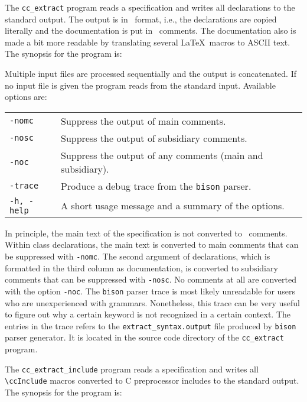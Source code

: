 \documentclass[12pt]{article}
\makeatletter
\newcommand{\TTindex}[1]{\index{#1@{\tt #1}}}
\def\ind{\hspace*{7mm}}
\makeatother
\begin{document}
The {\tt cc\_extract} program reads a specification and writes all
declarations to the standard output. The output is in \CC\ format,
i.e., the declarations are copied literally and the documentation is
put in \CC\ comments. The documentation also is made a bit more
readable by translating several \LaTeX\ macros to ASCII text. The
synopsis for the program is:

\ind{\tt cc\_extract [<options>] [<infile> ...]}

Multiple input files are processed sequentially and the output is
concatenated. If no input file is given the program reads from the
standard input. Available options are:

\begin{tabular}{ll}
    {\tt -nomc}  & Suppress the output of main comments. \\
    {\tt -nosc}  & Suppress the output of subsidiary comments. \\
    {\tt -noc}   & Suppress the output of any comments (main and subsidiary).\\
    {\tt -trace} & Produce a debug trace from the {\tt bison} parser. \\
    {\tt -h, -help} & A short usage message and a summary of the options.
\end{tabular}

In principle, the main text of the specification is not converted to
\CC\ comments. Within class declarations, the main text is converted
to main comments that can be suppressed with {\tt -nomc}. The second
argument of declarations, which is formatted in the third column as
documentation, is converted to subsidiary comments that can be
suppressed with {\tt -nosc}. No comments at all are converted with the
option {\tt -noc}. The {\tt bison} parser trace is most likely
unreadable for users who are unexperienced with grammars. Nonetheless,
this trace can be very useful to figure out why a certain keyword is
not recognized in a certain context. The entries in the trace refers
to the {\tt extract\_syntax.output} file produced by {\tt bison}
parser generator. It is located in the source code directory of the
{\tt cc\_extract} program.

The {\tt cc\_extract\_include} program reads a specification and
writes all \verb+\ccInclude+ macros converted to C preprocessor
includes to the standard output. The synopsis for the program is:

\ind{\tt cc\_extract\_include [<infile> ...]}
\TTindex{cc\_extract\_include}
\end{document}
